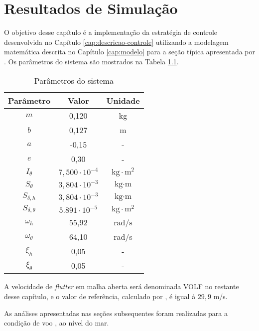 \chapter{Resultados de Simulação}\label{cap:resultados}

O objetivo desse capítulo é a implementação da estratégia de controle desenvolvida no Capítulo \ref{cap:descricao-controle} utilizando a modelagem matemática descrita no Capítulo \ref{cap:modelo} para a seção típica apresentada por \textcite{book:Fung}. Os parâmetros do sistema são mostrados na Tabela \ref{tab:parametros-secao-tipica}.

\begin{table}[h]
\centering
\caption{Parâmetros do sistema}
\begin{tabular}{ccc}
Parâmetro   & Valor & Unidade                 \\ \hline
$m$ & 0,120 & kg \\
$b$ & 0,127 & m  \\
$a$ & -0,15 & - \\
$e$ & 0,30  & - \\
$I_{\theta}$ & $7,500\cdot10^{-4}$ & $\text{kg} \cdot \text{m}^{2}$ \\
$S_{\theta}$ & $3,804\cdot10^{-3}$ & $\text{kg} \cdot \text{m}$  \\
$S_{\delta,h}$ & $3,804\cdot10^{-3}$ & $\text{kg} \cdot \text{m}$  \\
$S_{\delta,\theta}$ & $5.891\cdot10^{-5}$ & $\text{kg} \cdot \text{m}^{2}$ \\
$\omega_{h}$ & 55,92 & rad/s \\
$\omega_{\theta}$ & 64,10 & rad/s \\
$\xi_{h}$ & 0,05 & - \\
$\xi_{\theta}$ & 0,05 & - \\ \hline
\end{tabular}
\label{tab:parametros-secao-tipica}
\end{table}

A velocidade de \textit{flutter} em malha aberta será denominada \gls{VOLF} no restante desse capítulo, e o valor de referência, calculado por \textcite{book:Fung}, é igual à $29,9$ m/s. 

As análises apresentadas nas seções subsequentes foram realizadas para a condição de voo , ao nível do mar.


